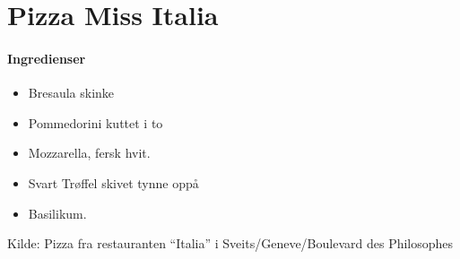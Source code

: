 \section{Pizza Miss Italia}


\paragraph{Ingredienser}
\begin{itemize}[noitemsep]
	\item Bresaula skinke
	\item Pommedorini kuttet i to
	\item Mozzarella, fersk hvit.
	\item Svart Trøffel skivet tynne oppå
	\item Basilikum.
\end{itemize}




Kilde: Pizza fra restauranten “Italia” i Sveits/Geneve/Boulevard des Philosophes
